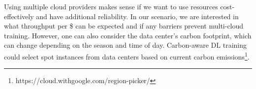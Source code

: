 Using multiple cloud providers makes sense if we want to use resources cost-effectively and have additional reliability.
In our scenario, we are interested in what throughput per \$ can be expected and if any barriers prevent multi-cloud training.
However, one can also consider the data center's carbon footprint, which can change depending on the season and time of day.
Carbon-aware DL training could select spot instances from data centers based on current carbon emissions\footnote{https://cloud.withgoogle.com/region-picker/}.
\vspace*{-2mm}
\begin{table}[h]
    \caption{Average multi-cloud throughput and latency.}
    \label{table:multicloud-network-profile}
    \vspace*{-8mm}
\end{table}

